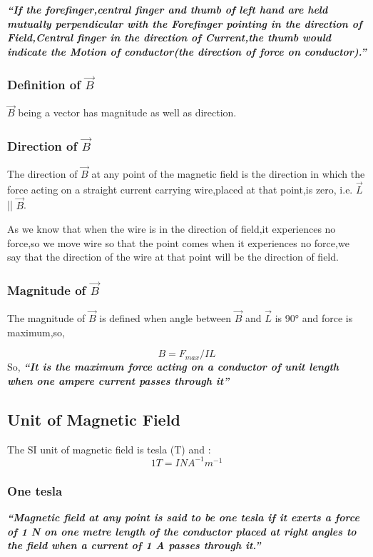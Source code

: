 \textit{\textbf{“If the forefinger,central finger and thumb of left hand are held mutually perpendicular with the Forefinger pointing in the direction of Field,Central finger in the direction of Current,the thumb would indicate the Motion of conductor(the direction of force on conductor).”}}

\subsubsection{Definition of $\vec{B}$}
$\vec{B}$ being a vector has magnitude as well as direction.

\subsubsection{Direction of $\vec{B}$}
The direction of $\vec{B}$ at any point of the magnetic field is the direction in which the force acting on a straight current carrying wire,placed at that point,is zero, i.e.  $\vec{L}$ || $\vec{B}$.

As we know that when the wire is in the direction of field,it experiences no force,so we move wire so that the point comes when it experiences no force,we say that the direction of the wire at that point will be the direction of field.

\subsubsection{Magnitude of $\vec{B}$}
The magnitude of $\vec{B}$ is defined when angle between $\vec{B}$ and $\vec{L}$ is 90° and force is maximum,so,

\begin{equation}
  B = F_{max}/IL \nonumber
\end{equation}
So, \textit{\textbf{“It is the maximum force acting on a conductor of unit length when one ampere current passes through it”}}

\subsection{Unit of Magnetic Field}
The SI unit of magnetic field  is tesla (T) and :
\begin{equation}
  1T = INA^{-1}m^{-1} \nonumber
\end{equation}

\subsubsection{One tesla}
\textit{\textbf{“Magnetic field at any point is said to be one tesla if it exerts a force of 1 N on one metre length of the conductor placed at right angles to the field when a current of 1 A passes through it.”}}
